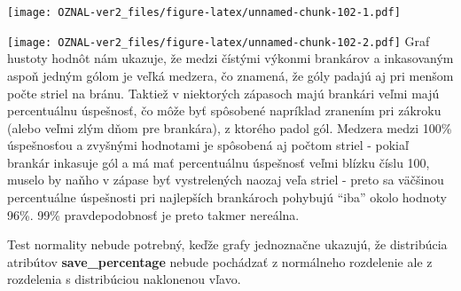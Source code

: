 \documentclass[
]{article}
\newenvironment{Shaded}{\begin{snugshade}}{\end{snugshade}}
\newcommand{\AttributeTok}[1]{\textcolor[rgb]{0.77,0.63,0.00}{#1}}
\newcommand{\ConstantTok}[1]{\textcolor[rgb]{0.00,0.00,0.00}{#1}}
\newcommand{\DecValTok}[1]{\textcolor[rgb]{0.00,0.00,0.81}{#1}}
\newcommand{\FloatTok}[1]{\textcolor[rgb]{0.00,0.00,0.81}{#1}}
\newcommand{\FunctionTok}[1]{\textcolor[rgb]{0.00,0.00,0.00}{#1}}
\newcommand{\NormalTok}[1]{#1}
\newcommand{\SpecialCharTok}[1]{\textcolor[rgb]{0.00,0.00,0.00}{#1}}
\newcommand{\StringTok}[1]{\textcolor[rgb]{0.31,0.60,0.02}{#1}}
\begin{document}
\begin{Shaded}
\end{Shaded}

\texttt{[image: OZNAL-ver2\_files/figure-latex/unnamed-chunk-102-1.pdf]}

\begin{Shaded}
\end{Shaded}

\texttt{[image: OZNAL-ver2\_files/figure-latex/unnamed-chunk-102-2.pdf]}
Graf hustoty hodnôt nám ukazuje, že medzi čístými výkonmi brankárov a
inkasovaným aspoň jedným gólom je veľká medzera, čo znamená, že góly
padajú aj pri menšom počte striel na bránu. Taktiež v niektorých
zápasoch majú brankári veľmi majú percentuálnu úspešnosť, čo môže byť
spôsobené napríklad zranením pri zákroku (alebo veľmi zlým dňom pre
brankára), z ktorého padol gól. Medzera medzi 100\% úspešnosťou a
zvyšnými hodnotami je spôsobená aj počtom striel - pokiaľ brankár
inkasuje gól a má mať percentuálnu úspešnosť veľmi blízku číslu 100,
muselo by naňho v zápase byť vystrelených naozaj veľa striel - preto sa
väčšinou percentuálne úspešnosti pri najlepších brankároch pohybujú
``iba'' okolo hodnoty 96\%. 99\% pravdepodobnosť je preto takmer
nereálna.

Test normality nebude potrebný, keďže grafy jednoznačne ukazujú, že
distribúcia atribútov \textbf{save\_percentage} nebude pochádzať z
normálneho rozdelenie ale z rozdelenia s distribúciou naklonenou vľavo.

\begin{Shaded}
\end{Shaded}
\end{document}

